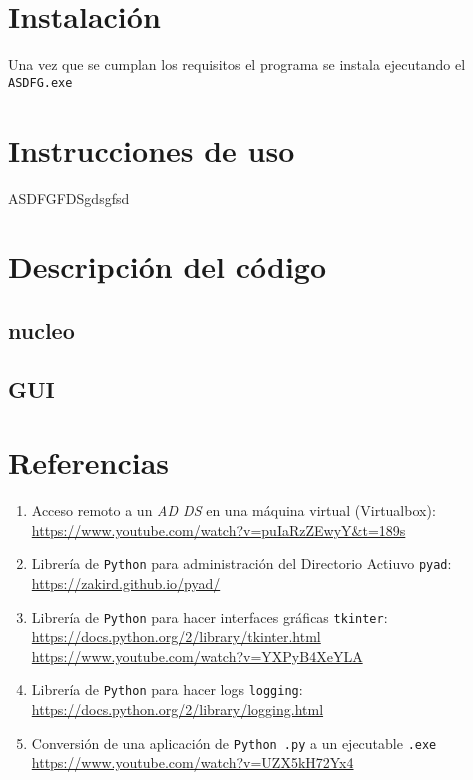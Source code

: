 \documentclass{itam}
\begin{document}
\section{Instalación}
Una vez que se cumplan los requisitos el programa se instala ejecutando el \verb|ASDFG.exe|

\section{Instrucciones de uso}
ASDFGFDSgdsgfsd

\section{Descripción del código}
\subsection{nucleo}


\subsection{GUI}

\section{Referencias}
\begin{enumerate}
    \item Acceso remoto a un \emph{AD DS} en una máquina virtual (Virtualbox): \\
        \url{https://www.youtube.com/watch?v=puIaRzZEwyY&t=189s}
    \item Librería de \verb|Python| para administración del Directorio Actiuvo \verb|pyad|: \\
        \url{https://zakird.github.io/pyad/}
    \item Librería de \verb|Python| para hacer interfaces gráficas \verb|tkinter|: \\
        \url{https://docs.python.org/2/library/tkinter.html} \\
        \url{https://www.youtube.com/watch?v=YXPyB4XeYLA}
    \item Librería de \verb|Python| para hacer logs \verb|logging|: \\
        \url{https://docs.python.org/2/library/logging.html}
    \item Conversión de una aplicación de \verb|Python .py| a un ejecutable \verb|.exe|
        \url{https://www.youtube.com/watch?v=UZX5kH72Yx4}
\end{enumerate}
\end{document}
